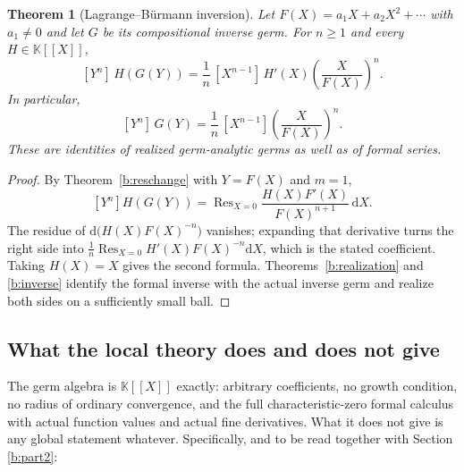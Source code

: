 \documentclass[11pt,a4paper]{article}
\numberwithin{equation}{section}
\newtheorem{theorem}{Theorem}[section]
\theoremstyle{definition}
\theoremstyle{remark}
\theoremstyle{plain}
\newcommand{\K}{\mathbb K}
\DeclareMathOperator{\Res}{Res}                 %
\newcommand{\dd}{\mathrm d}
\begin{document}
\begin{theorem}[Lagrange--B\"urmann inversion]
\label{b:lagrange}
Let $F(X)=a_1X+a_2X^{2}+\cdots$ with $a_1\ne0$ and let $G$ be its
compositional inverse germ. For $n\ge1$ and every $H\in\K[[X]]$,
\[
 [Y^{n}]\,H(G(Y))
 =\frac1n\,[X^{n-1}]\,H'(X)\left(\frac{X}{F(X)}\right)^{n}.
\]
In particular,
\[
 [Y^{n}]\,G(Y)=\frac1n\,[X^{n-1}]\left(\frac{X}{F(X)}\right)^{n}.
\]
These are identities of realized germ-analytic germs as well as of formal
series.
\end{theorem}

\begin{proof}
By Theorem~\ref{b:reschange} with $Y=F(X)$ and $m=1$,
\[
 [Y^{n}]H(G(Y))=\Res_{X=0}\frac{H(X)F'(X)}{F(X)^{n+1}}\,\dd X .
\]
The residue of $\dd\bigl(H(X)F(X)^{-n}\bigr)$ vanishes; expanding that
derivative turns the right side into
$\frac1n\Res_{X=0}H'(X)F(X)^{-n}\dd X$, which is the stated coefficient.
Taking $H(X)=X$ gives the second formula. Theorems~\ref{b:realization} and
\ref{b:inverse} identify the formal inverse with the actual inverse germ
and realize both sides on a sufficiently small ball.
\end{proof}

\subsection{What the local theory does and does not give}

The germ algebra is $\K[[X]]$ exactly: arbitrary coefficients, no growth
condition, no radius of ordinary convergence, and the full
characteristic-zero formal calculus with actual function values and actual
fine derivatives. What it does not give is any global statement whatever.
Specifically, and to be read together with Section \ref{b:part2}:
\end{document}
